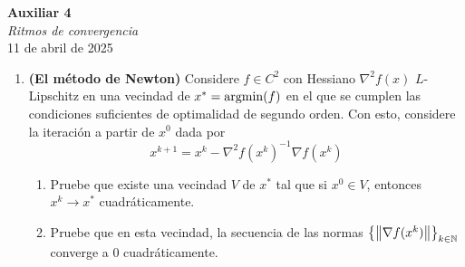 \documentclass{article}
\begin{document}


\begin{center}
    \Huge{\textbf{Auxiliar 4}}\\
	\textit{\large{Ritmos de convergencia}}\\
    \normalsize
	11 de abril de 2025
\end{center}

\begin{enumerate}
	\item \textbf{(El método de Newton)} Considere \( f \in C^2 \) con Hessiano \( \nabla^2 f(x) \) \( L \)-Lipschitz en una vecindad de \( x^* = \operatorname{argmin}(f) \) en el que se cumplen las condiciones suficientes de optimalidad de segundo orden. Con esto, considere la iteración a partir de \( x^0 \) dada por
\[
x^{k+1} = x^k - \nabla^2 f(x^k)^{-1} \nabla f(x^k)
\]
\begin{enumerate}
    \item Pruebe que existe una vecindad \( V \) de \( x^* \) tal que si \( x^0 \in V \), entonces \( x^k \to x^* \) cuadráticamente.
    \item Pruebe que en esta vecindad, la secuencia de las normas \( \left\{ \norm{\nabla f(x^k)} \right\}_{k \in \mathbb{N}} \) converge a \( 0 \) cuadráticamente.
\end{enumerate}
\end{enumerate}
\end{document}
